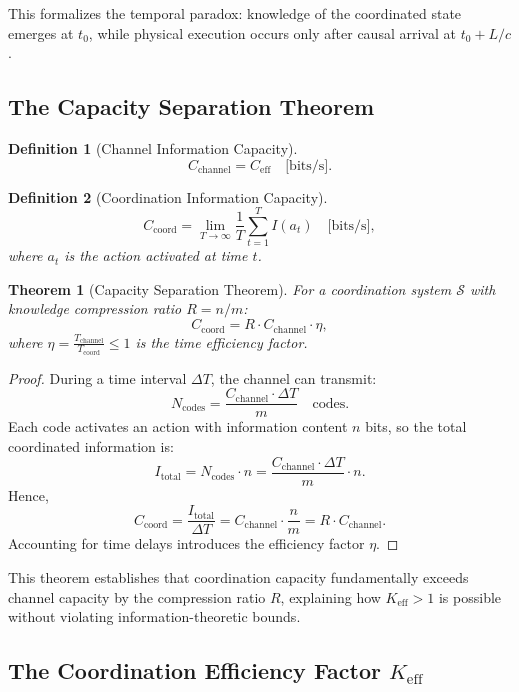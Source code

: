 \documentclass[11pt,a4paper]{article}
\newtheorem{theorem}{Theorem}
\newtheorem{definition}{Definition}
\begin{document}
This formalizes the temporal paradox: knowledge of the coordinated state emerges at $t_0$, while physical execution occurs only after causal arrival at $t_0 + L/c$.

\subsection{The Capacity Separation Theorem}

\begin{definition}[Channel Information Capacity]
	\[
	C_{\text{channel}} = C_{\text{eff}} \quad \text{[bits/s]}.
	\]
\end{definition}

\begin{definition}[Coordination Information Capacity]
	\[
	C_{\text{coord}} = \lim_{T \to \infty} \frac{1}{T} \sum_{t=1}^{T} I(a_t) \quad \text{[bits/s]},
	\]
	where $a_t$ is the action activated at time $t$.
\end{definition}

\begin{theorem}[Capacity Separation Theorem]
	\label{thm:capacity-separation}
	For a coordination system $\mathcal{S}$ with knowledge compression ratio $R = n/m$:
	\[
	C_{\text{coord}} = R \cdot C_{\text{channel}} \cdot \eta,
	\]
	where $\eta = \frac{T_{\text{channel}}}{T_{\text{coord}}} \leq 1$ is the time efficiency factor.
\end{theorem}

\begin{proof}
	During a time interval $\Delta T$, the channel can transmit:
	\[
	N_{\text{codes}} = \frac{C_{\text{channel}} \cdot \Delta T}{m} \quad \text{codes}.
	\]
	Each code activates an action with information content $n$ bits, so the total coordinated information is:
	\[
	I_{\text{total}} = N_{\text{codes}} \cdot n = \frac{C_{\text{channel}} \cdot \Delta T}{m} \cdot n.
	\]
	Hence,
	\[
	C_{\text{coord}} = \frac{I_{\text{total}}}{\Delta T} = C_{\text{channel}} \cdot \frac{n}{m} = R \cdot C_{\text{channel}}.
	\]
	Accounting for time delays introduces the efficiency factor $\eta$.
\end{proof}

This theorem establishes that coordination capacity fundamentally exceeds channel capacity by the compression ratio $R$, explaining how $K_{\mathrm{eff}} > 1$ is possible without violating information-theoretic bounds.

\subsection{The Coordination Efficiency Factor $K_{\mathrm{eff}}$}
\end{document}
